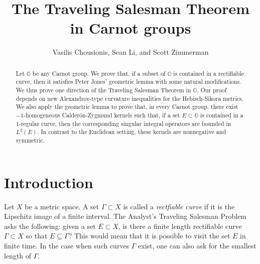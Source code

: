 \documentclass[11pt]{amsart}
\title[The TST in Carnot Groups]{The Traveling Salesman Theorem in Carnot groups}
\author{Vasilis Chousionis, Sean Li, and Scott Zimmerman}
\theoremstyle{definition}
\newcommand{\G}{\mathbb G}
\numberwithin{theorem}{section} \numberwithin{equation}{section}
\begin{document}
\begin{abstract}
Let $\G$ be any Carnot group. We prove that, if a subset of $\G$  is contained in a rectifiable curve, then it satisfies Peter Jones' geometric lemma with some natural modifications. We thus prove one direction of the Traveling Salesman Theorem in $\G$. Our proof depends on new Alexandrov-type curvature inequalities for the Hebisch-Sikora metrics. We also apply the geometric lemma to prove that, in every Carnot group, there exist $-1$-homogeneous Calder\'on-Zygmund kernels  such that, if a set $E \subset \G$ is contained in a 1-regular curve, then the corresponding singular integral operators are bounded in $L^2(E)$. In contrast to the Euclidean setting, these kernels are nonnegative and symmetric.
\end{abstract}

\maketitle




\section{Introduction}

Let $X$ be a metric space. A set $\Gamma \subset X$ is called a {\em rectfiable curve} if it is the Lipschitz image of a finite interval. The Analyst's Traveling Salesman Problem asks the following: given a set $E \subset X$, is there a finite length rectifiable curve $\Gamma \subset X$ so that $E \subseteq \Gamma$?  This would mean that it is possible to visit the set $E$ in finite time.  In the case when such curves $\Gamma$ exist, 
one can also ask for the smallest length of $\Gamma$. %
\end{document}

